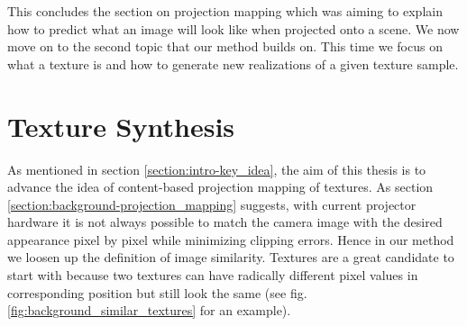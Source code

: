 This concludes the section on projection mapping which was aiming to explain how to predict what an image will look like when projected onto a scene. We now move on to the second topic that our method builds on. This time we focus on what a texture is and how to generate new realizations of a given texture sample.

\section{Texture Synthesis}
\label{section:background-texture_synthesis}

As mentioned in section \ref{section:intro-key_idea}, the aim of this thesis is to advance the idea of content-based projection mapping of textures. As section \ref{section:background-projection_mapping} suggests, with current projector hardware it is not always possible to match the camera image with the desired appearance pixel by pixel while minimizing clipping errors. Hence in our method we loosen up the definition of image similarity. Textures are a great candidate to start with because two textures can have radically different pixel values in corresponding position but still look the same (see fig. \ref{fig:background_similar_textures} for an example).

